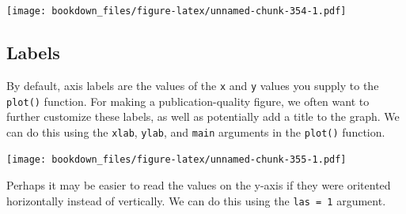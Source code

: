 \documentclass[]{krantz}
\makeatletter
\newenvironment{Shaded}{\begin{snugshade}}{\end{snugshade}}
\newcommand{\KeywordTok}[1]{\textcolor[rgb]{0.27,0.27,0.27}{\textbf{#1}}}
\newcommand{\DataTypeTok}[1]{\textcolor[rgb]{0.27,0.27,0.27}{#1}}
\newcommand{\DecValTok}[1]{\textcolor[rgb]{0.06,0.06,0.06}{#1}}
\newcommand{\StringTok}[1]{\textcolor[rgb]{0.5,0.5,0.5}{#1}}
\newcommand{\OperatorTok}[1]{\textcolor[rgb]{0.43,0.43,0.43}{\textbf{#1}}}
\newcommand{\NormalTok}[1]{#1}
\newenvironment{kframe}{%
\medskip{}
\setlength{\fboxsep}{.8em}
 \def\at@end@of@kframe{}%
 \ifinner\ifhmode%
  \def\at@end@of@kframe{\end{minipage}}%
  \begin{minipage}{\columnwidth}%
 \fi\fi%
 \def\FrameCommand##1{\hskip\@totalleftmargin \hskip-\fboxsep
 \colorbox{shadecolor}{##1}\hskip-\fboxsep
     \hskip-\linewidth \hskip-\@totalleftmargin \hskip\columnwidth}%
 \MakeFramed {\advance\hsize-\width
   \@totalleftmargin\z@ \linewidth\hsize
   \@setminipage}}%
 {\par\unskip\endMakeFramed%
 \at@end@of@kframe}
\renewenvironment{Shaded}{\begin{kframe}}{\end{kframe}}
\makeatother
\begin{document}
\begin{Shaded}
\end{Shaded}

\texttt{[image: bookdown\_files/figure-latex/unnamed-chunk-354-1.pdf]}

\subsection{Labels}\label{labels-1}

By default, axis labels are the values of the \texttt{x} and \texttt{y}
values you supply to the \texttt{plot()} function. For making a
publication-quality figure, we often want to further customize these
labels, as well as potentially add a title to the graph. We can do this
using the \texttt{xlab}, \texttt{ylab}, and \texttt{main} arguments in
the \texttt{plot()} function.

\begin{Shaded}
\end{Shaded}

\texttt{[image: bookdown\_files/figure-latex/unnamed-chunk-355-1.pdf]}

Perhaps it may be easier to read the values on the y-axis if they were
oritented horizontally instead of vertically. We can do this using the
\texttt{las\ =\ 1} argument.

\begin{Shaded}
\end{Shaded}
\end{document}
